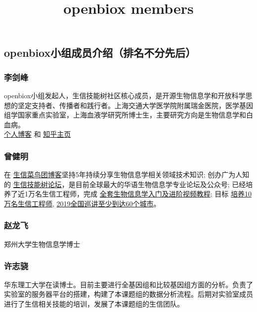 \documentclass[]{article}
\title{openbiox members}
\author{}
\date{}
\begin{document}
\maketitle

\subsection{openbiox小组成员介绍（排名不分先后）}\label{openbiox}

\subsubsection{李剑峰}

openbiox小组发起人，生信技能树社区核心成员，是开源生物信息学和开放科学思想的坚定支持者、传播者和践行者。上海交通大学医学院附属瑞金医院，医学基因组学国家重点实验室，上海血液学研究所博士生，主要研究方向是生物信息学和白血病。\\
\href{https://life2cloud.com}{个人博客} 和
\href{https://www.zhihu.com/people/life2cloud}{知乎主页}

\subsubsection{曾健明}

在
\href{http://www.bio-info-trainee.com/}{生信菜鸟团博客}坚持5年持续分享生物信息学相关领域技术知识;
创办广为人知的
\href{http://www.biotrainee.com/}{生信技能树论坛}，是目前全球最大的华语生物信息学专业论坛及公众号;
已经培养了近1万名生信工程师，完成
\href{https://space.bilibili.com/338686099}{全套生物信息学入门及进阶视频教程};
目标
\href{https://mp.weixin.qq.com/s/E9ykuIbc-2Ja9HOY0bn_6g}{培养10万名生信工程师},
\href{https://static.dingtalk.com/media/lALPAuoR5z1wDQ3NA_DNAoA_640_1008.png}{2019全国巡讲至少到达60个城市}。

\subsubsection{赵龙飞}

郑州大学生物信息学博士

\subsubsection{许志骁}

华东理工大学在读博士。目前主要进行全基因组和比较基因组方面的分析。负责了实验室的服务器平台的搭建，构建了本课题组的数据分析流程。后期对实验室成员进行了生信相关技能的培训，发展了本课题组的生信团队。
\end{document}
